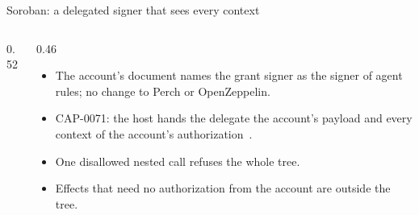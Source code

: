 \documentclass[aspectratio=169,11pt]{beamer}
\begin{document}
\begin{frame}{Soroban: a delegated signer that sees every context}
  \begin{columns}[c]
    \begin{column}{0.52\linewidth}
      \centering
      \resizebox{\linewidth}{!}{}
    \end{column}
    \begin{column}{0.46\linewidth}
      \small
      \begin{itemize}
        \item The account's document names the grant signer as the signer of
          agent rules; no change to Perch or OpenZeppelin.
        \item CAP-0071: the host hands the delegate the account's payload and
          every context of the account's
          authorization~\cite{cap7101}.
        \item One disallowed nested call refuses the whole
          tree.
        \item Effects that need no authorization from the account are outside
          the tree.
      \end{itemize}
    \end{column}
  \end{columns}
\end{frame}
\end{document}

